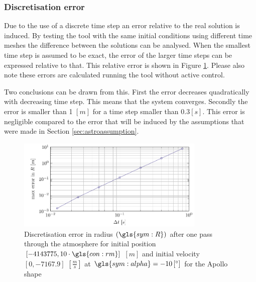 \subsubsection{Discretisation error}
\label{sec:astrodisc}

Due to the use of a discrete time step an error relative to the real solution is induced. By testing the tool with the same initial conditions using different time meshes the difference between the solutions can be analysed. When the smallest time step is assumed to be exact, the error of the larger time steps can be expressed relative to that. This relative error is shown in Figure \ref{fig:atmos_disc}. Please also note these errors are calculated running the tool without active control.

Two conclusions can be drawn from this. First the error decreases quadratically with decreasing time step. This means that the system converges. Secondly the error is smaller than 1 $\left[m\right]$ for a time step smaller than $0.3 \left[s\right]$. This error is negligible compared to the error that will be induced by the assumptions that were made in Section \ref{sec:astroassumption}.



\begin{figure}[ht]
	\centering
	\includegraphics[width=0.8\textwidth]{Figure/orbit/dicretization.pdf}
	\caption[Discretisation error in radius $\left(\gls{sym:R}\right)$ after one pass through the atmosphere for the rigid shape]{Discretisation error in radius $\left(\gls{sym:R}\right)$ after one pass through the atmosphere for initial position $\left[-4143775,10\cdot\gls{con:rm}\right]$ $\left[m\right]$ and initial velocity $\left[0,-7167.9\right]$ $\left[\frac{m}{s}\right]$ at $\gls{sym:alpha}=-10\left[^\circ\right]$ for the Apollo shape}
	\label{fig:atmos_disc}
\end{figure}

